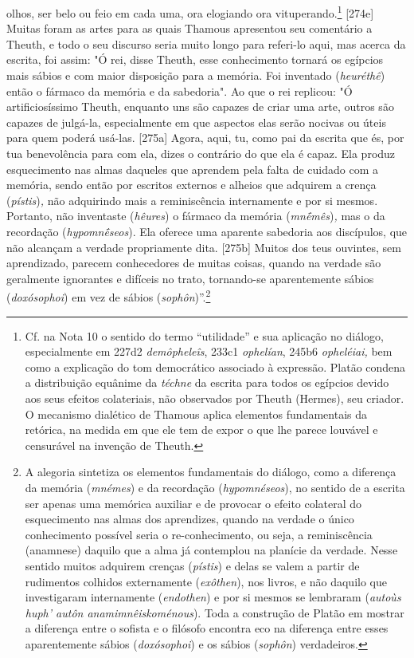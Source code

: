 olhos, ser belo ou feio em cada uma, ora elogiando ora
vituperando.\footnote{Cf. na Nota 10 o sentido do termo ``utilidade'' e
  sua aplicação no diálogo, especialmente em 227d2 \emph{demôpheleîs},
  233c1 \emph{ophelían}, 245b6 \emph{opheléiai,} bem como a explicação
  do tom democrático associado à expressão. Platão condena a
  distribuição equânime da \emph{téchne} da escrita para todos os
  egípcios devido aos seus efeitos colateriais, não observados por
  Theuth (Hermes), seu criador. O mecanismo dialético de Thamous aplica
  elementos fundamentais da retórica, na medida em que ele tem de expor
  o que lhe parece louvável e censurável na invenção de Theuth.}
{[}274e{]} Muitas foram as artes para as quais Thamous apresentou seu
comentário a Theuth, e todo o seu discurso seria muito longo para
referi-lo aqui, mas acerca da escrita, foi assim: "Ó rei, disse Theuth,
esse conhecimento tornará os egípcios mais sábios e com maior disposição
para a memória. Foi inventado (\emph{heuréthê}) então o fármaco da
memória e da sabedoria". Ao que o rei replicou: "Ó artificiosíssimo
Theuth, enquanto uns são capazes de criar uma arte, outros são capazes
de julgá-la, especialmente em que aspectos elas serão nocivas ou úteis
para quem poderá usá-las. {[}275a{]} Agora, aqui, tu, como pai da
escrita que és, por tua benevolência para com ela, dizes o contrário do
que ela é capaz. Ela produz esquecimento nas almas daqueles que aprendem
pela falta de cuidado com a memória, sendo então por escritos externos e
alheios que adquirem a crença (\emph{pístis})\emph{,} não adquirindo
mais a reminiscência internamente e por si mesmos. Portanto, não
inventaste (\emph{hêures}) o fármaco da memória (\emph{mnḗmês})\emph{,}
mas o da recordação (\emph{hypomnḗseos}). Ela oferece uma aparente
sabedoria aos discípulos, que não alcançam a verdade propriamente dita.
{[}275b{]} Muitos dos teus ouvintes, sem aprendizado, parecem
conhecedores de muitas coisas, quando na verdade são geralmente
ignorantes e difíceis no trato, tornando-se aparentemente sábios
(\emph{doxósophoi}) em vez de sábios (\emph{sophôn})''.\footnote{A
  alegoria sintetiza os elementos fundamentais do diálogo, como a
  diferença da memória (\emph{mnémes}) e da recordação
  (\emph{hypomnéseos}), no sentido de a escrita ser apenas uma memórica
  auxiliar e de provocar o efeito colateral do esquecimento nas almas
  dos aprendizes, quando na verdade o único conhecimento possível seria
  o re-conhecimento, ou seja, a reminiscência (anamnese) daquilo que a
  alma já contemplou na planície da verdade. Nesse sentido muitos
  adquirem crenças (\emph{pístis}) e delas se valem a partir de
  rudimentos colhidos externamente (\emph{exôthen}), nos livros, e não
  daquilo que investigaram internamente (\emph{endothen}) e por si
  mesmos se lembraram (\emph{autoùs huph' autôn anamimnêiskoménous}).
  Toda a construção de Platão em mostrar a diferença entre o sofista e o
  filósofo encontra eco na diferença entre esses aparentemente sábios
  (\emph{doxósophoi}) e os sábios (\emph{sophôn}) verdadeiros.}

